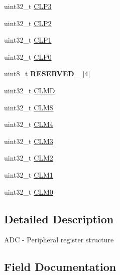\begin{DoxyCompactItemize}
\item 
uint32\+\_\+t \hyperlink{struct_a_d_c___mem_map_a3f5dd3a4999f81c45c41be08a3849b98}{C\+L\+P3}
\item 
uint32\+\_\+t \hyperlink{struct_a_d_c___mem_map_a225ce534c9832c8555edd6473b59a41d}{C\+L\+P2}
\item 
uint32\+\_\+t \hyperlink{struct_a_d_c___mem_map_a64450733d1755c38f9466f948ed168c5}{C\+L\+P1}
\item 
uint32\+\_\+t \hyperlink{struct_a_d_c___mem_map_a8297494e7932e271cc59eb5aa896a10e}{C\+L\+P0}
\item 
\hypertarget{struct_a_d_c___mem_map_a71277aaa40be4473ac2521981f273bd3}{}uint8\+\_\+t {\bfseries R\+E\+S\+E\+R\+V\+E\+D\+\_} \mbox{[}4\mbox{]}\label{struct_a_d_c___mem_map_a71277aaa40be4473ac2521981f273bd3}

\item 
uint32\+\_\+t \hyperlink{struct_a_d_c___mem_map_a42f179fbfbc8051ccb50bc11792ef3ee}{C\+L\+M\+D}
\item 
uint32\+\_\+t \hyperlink{struct_a_d_c___mem_map_aef7c15535415480c4d2ca4d7cc86deab}{C\+L\+M\+S}
\item 
uint32\+\_\+t \hyperlink{struct_a_d_c___mem_map_aead273022ba55e043f5e0a81d9c5b7c8}{C\+L\+M4}
\item 
uint32\+\_\+t \hyperlink{struct_a_d_c___mem_map_aadc0a60c45854df3d46a33790759ef5f}{C\+L\+M3}
\item 
uint32\+\_\+t \hyperlink{struct_a_d_c___mem_map_a4efbf939e8f39accffa83b16f9607587}{C\+L\+M2}
\item 
uint32\+\_\+t \hyperlink{struct_a_d_c___mem_map_a846cc51f8b255a74920d53c497e690ee}{C\+L\+M1}
\item 
uint32\+\_\+t \hyperlink{struct_a_d_c___mem_map_a511c5f41f61227c49738a729b856bc26}{C\+L\+M0}
\end{DoxyCompactItemize}


\subsection{Detailed Description}
A\+D\+C -\/ Peripheral register structure 

\subsection{Field Documentation}
\hypertarget{struct_a_d_c___mem_map_a50355545bc85131128f24459e40f1711}{}
